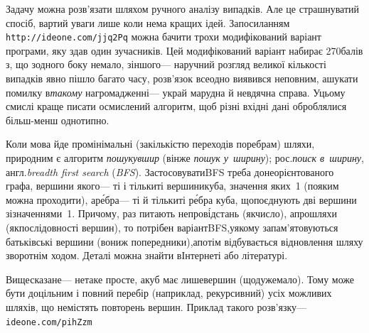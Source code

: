 \documentclass[14pt,a4paper]{extarticle}
\begin{document}
	

\Tutorial	Задачу можна розв'язати шляхом ручного аналізу випадків. Але це страшнуватий спосіб, вартий уваги лише коли нема кращих ідей. За\nolinebreak[2] посиланням \verb"http://ideone.com/jjq2Pq" можна бачити трохи модифікований варіант програми, яку здав один з\nolinebreak[3] учасників. Цей модифікований варіант набирає 270\nolinebreak[3] балів з, що з\nolinebreak[3] одного боку немало, з\nolinebreak[3] іншого\nolinebreak[3] --- на\nolinebreak[3] ручний розгляд великої кількості випадків явно пішло багато часу, розв'язок все\nolinebreak[2] одно виявився не\nolinebreak[3] повним, а\nolinebreak[3] шукати помилку в\nolinebreak[3] \emph{такому} нагромадженні\nolinebreak[3] --- украй марудна й невдячна справа. У\nolinebreak[3] цьому смислі краще писати осмислений алгоритм, щоб різні вхідні дані оброблялися більш-менш однотипно.

{


Коли мова йде про\nolinebreak[3] мінімальні (за\nolinebreak[3] кількістю переходів по\nolinebreak[3] ребрам) шляхи, природним є алгоритм \emph{пошуку\nolinebreak[3] вшир} (він\nolinebreak[3] же \emph{пошук у~ширину}); рос.\nolinebreak[3] \emph{поиск в~ширину}, англ.\nolinebreak[3] \emph{breadth first search} (\emph{BFS}). Застосовувати\nolinebreak[2] BFS треба до\nolinebreak[3] неорієн\-то\-ваного графа, вершини якого\nolinebreak[3] --- ті і тільки\nolinebreak[3] ті вершини\nolinebreak[1] куба, значення яких~1 (по\nolinebreak[3] яким можна проходити), а\nolinebreak[3] р\'{е}бра\nolinebreak[3] --- ті й тільки\nolinebreak[3] ті р\'{е}бра куба, що\nolinebreak[3] поєднують дві вершини зі\nolinebreak[3] значеннями~1. Причому, раз питають не\nolinebreak[3] про\nolinebreak[1] в\'{і}д\-стань (як\nolinebreak[3] число), а\nolinebreak[3] про\nolinebreak[1] шляхи (як\nolinebreak[3] послідовності вершин), то потрібен варіант\nolinebreak[2] BFS,\linebreak[1] у\nolinebreak[3] якому запам'ятовуються батьківські вершини (вони\nolinebreak[3] ж попередники),\linebreak[1] а\nolinebreak[3] потім відбувається відновлення шляху зворотнім ходом. Деталі можна знайти в\nolinebreak[3] Інтернеті або літературі.

}

Вищесказане\nolinebreak[3] --- не\nolinebreak[3] таке просте, а\nolinebreak[3] куб має лише\nolinebreak[3] вершин (що\nolinebreak[3] дуже\nolinebreak[1] мало). Тому може бути доцільним і повний перебір (наприклад, рекурсивний) усіх можливих шляхів, що не\nolinebreak[3] містять повторень вершин. Приклад такого розв'язку\nolinebreak[3] --- 
\verb"ideone.com/pihZzm"
\end{document}
